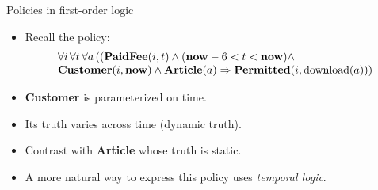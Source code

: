 \documentclass[style=sailor,size=12pt]{powerdot}
\begin{document}
\begin{wideslide}[bm=,toc=]{Policies in first-order logic}
\begin{itemize}
\item Recall the policy:
\begin{displaymath}
\begin{array}{l}
\forall i\, \forall t\, \forall a\, ((\mbox{\bf PaidFee}(i,t)\wedge (\mbox{\bf now} - 6 < t < \mbox{\bf now})\wedge \\
\mbox{\bf Customer}(i,\mbox{\bf now})\wedge\mbox{\bf Article}(a) \Rightarrow \mbox{\bf Permitted}(i,\mbox{\rm download}(a)))
\end{array}
\end{displaymath}
\item {\bf Customer} is parameterized on time.
\item Its truth varies across time (dynamic truth).
\item Contrast with {\bf Article} whose truth is static.
\item A more natural way to express this policy uses {\em temporal logic\/}.
\end{itemize}
\end{wideslide}
\end{document}
